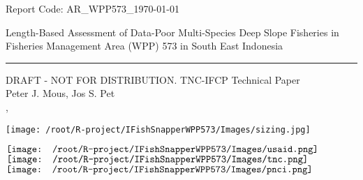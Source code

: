 \begin{titlepage}
\begin{flushleft}
	\textsf{Report Code: AR\_WPP573\_{\today}}
\end{flushleft}

\vspace*{2cm}
\begin{flushright}
        {\Large\textsf{Length-Based Assessment of Data-Poor Multi-Species Deep Slope Fisheries in 
        \\[0.2cm] Fisheries Management Area (WPP) 573 in South East Indonesia}}\\[0.2cm]
        \rule{\linewidth}{0.5mm}
        \textsf{DRAFT - NOT FOR DISTRIBUTION. TNC-IFCP Technical Paper}\\[2cm]
        \textsf{Peter J. Mous, Jos S. Pet\\[1cm]
        {\MakeUppercase{\MONTH}} {\the\day}, {\the\year}}
\end{flushright}

\begin{center}
\texttt{[image: /root/R-project/IFishSnapperWPP573/Images/sizing.jpg]}
\end{center}

\vfill

\noindent
\begin{minipage}[b]{\linewidth}
\noindent
\centering
$\vcenter{\hbox{\texttt{[image: /root/R-project/IFishSnapperWPP573/Images/usaid.png]}}}$
\hfill
$\vcenter{\hbox{\texttt{[image: /root/R-project/IFishSnapperWPP573/Images/tnc.png]}}}$
\hfill
$\vcenter{\hbox{\texttt{[image: /root/R-project/IFishSnapperWPP573/Images/pnci.png]}}}$
\end{minipage}
\end{titlepage}